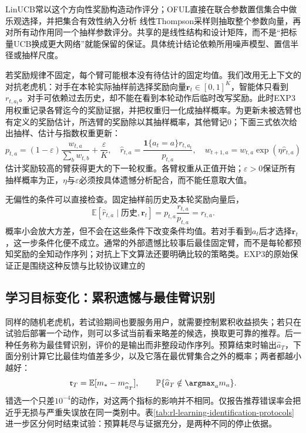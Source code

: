 LinUCB常以这个方向性奖励构造动作评分；OFUL直接在联合参数置信集合中做乐观选择，并把集合有效性纳入分析
线性Thompson采样则抽取整个参数向量，再对所有动作用同一个抽样参数评分。共享的是线性结构和设计矩阵，而不是“把标量UCB换成更大网络”就能保留的保证。具体统计结论依赖所用噪声模型、置信半径或抽样尺度。

若奖励规律不固定，每个臂可能根本没有待估计的固定均值。我们改用无上下文的对抗老虎机：对手在本轮实际抽样前选择奖励向量$\bm{r}_t\in[0,1]^K$，智能体只看到$r_{t,a_t}$。对手可依赖过去历史，却不能在看到本轮动作后临时改写奖励。此时EXP3用权重记录各臂迄今的奖励证据，并把权重归一化成抽样概率。为更新未被选臂也有定义的奖励估计，所选臂的奖励除以其抽样概率，其他臂记0；下面三式依次给出抽样、估计与指数权重更新：
\begin{equation}
  p_{t,a}=(1-\varepsilon)\frac{w_{t,a}}{\sum_b w_{t,b}}
                 +\frac{\varepsilon}{K},\quad
  \widehat r_{t,a}=\frac{\mathbf 1\{a_t=a\}r_{t,a_t}}{p_{t,a}},
  \quad
  w_{t+1,a}=w_{t,a}\exp(\eta\widehat r_{t,a})
  \label{eq:rl-learning-exp3}
\end{equation}
估计奖励较高的臂获得更大的下一轮权重。各臂权重从正值开始；$\varepsilon>0$保证所有抽样概率为正，$\eta$与$\varepsilon$必须按具体遗憾分析配合，而不能任意取大值。

无偏性的条件可以直接检查。固定抽样前历史及本轮奖励向量后，
\[
  \mathbb E[\widehat r_{t,a}\mid\text{历史},\bm{r}_t]
  =p_{t,a}\frac{r_{t,a}}{p_{t,a}}=r_{t,a}.
\]
概率小会放大方差，但不会在这些条件下改变条件均值。若对手看到$a_t$后才选择$\bm{r}_t$，这一步条件化便不成立。通常的外部遗憾比较事后最佳固定臂，而不是每轮都预知奖励的全知动作序列；对抗上下文算法还要明确比较的策略类。EXP3的原始保证正是围绕这种反馈与比较协议建立的

\subsection{学习目标变化：累积遗憾与最佳臂识别}
\label{sec:rl-learning-best-arm}

同样的随机老虎机，若试验期间也要服务用户，就需要控制累积收益损失；若只在试验后部署一个动作，则可以多试当前看来略差的候选，换取更可靠的推荐。后一种任务称为最佳臂识别，评价的是输出而非整段动作序列。预算结束时输出$\widehat a_T$，下面分别计算它比最佳均值差多少，以及它落在最优臂集合之外的概率；两者都越小越好：
\begin{equation}
  \mathfrak r_T=\mathbb E[m_*-m_{\widehat a_T}],
  \qquad
  \mathbb P\{\widehat a_T\notin\argmax_a m_a\}.
  \label{eq:rl-learning-simple-regret}
\end{equation}
错选一个只差$10^{-4}$的动作，对这两个指标的影响并不相同。仅报告推荐错误率会把近乎无损与严重失误放在同一类别中。表\ref{tab:rl-learning-identification-protocols}进一步区分何时结束试验：预算耗尽与证据充分，是两种不同的停止依据。

